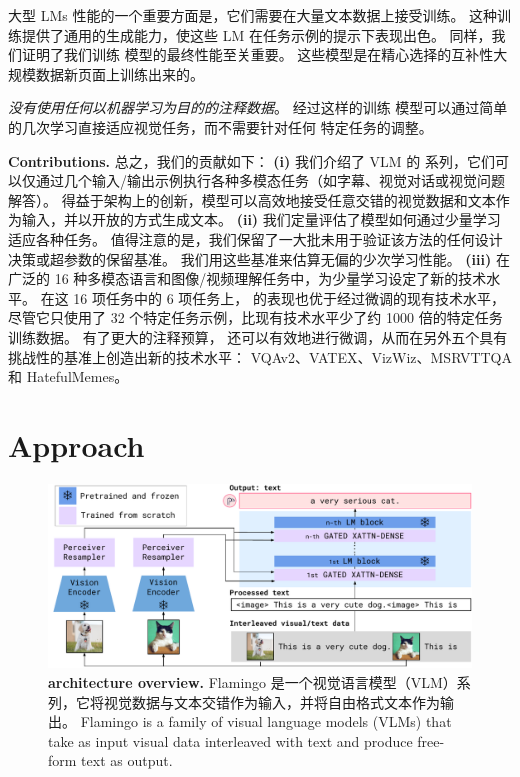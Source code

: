 \parbox{\textwidth}{大型 LMs 性能的一个重要方面是，它们需要在大量文本数据上接受训练。
这种训练提供了通用的生成能力，使这些 LM 在任务示例的提示下表现出色。
同样，我们证明了我们训练
\method{}模型的最终性能至关重要。
这些模型是在精心选择的互补性大规模数据新页面上训练出来的。\parfillskip=0pt} \emph{没有使用任何以机器学习为目的的注释数据}。
经过这样的训练
\method{} 模型可以通过简单的几次学习直接适应视觉任务，而不需要针对任何
特定任务的调整。



\noindent
\textbf{Contributions.}
总之，我们的贡献如下：
\textbf{(i)} 我们介绍了 VLM 的 \method{} 系列，它们可以仅通过几个输入/输出示例执行各种多模态任务（如字幕、视觉对话或视觉问题解答）。
得益于架构上的创新，\method{}模型可以高效地接受任意交错的视觉数据和文本作为输入，并以开放的方式生成文本。%
\textbf{(ii)} 我们定量评估了模型如何通过少量学习适应各种任务。%
值得注意的是，我们保留了一大批未用于验证该方法的任何设计决策或超参数的保留基准。
我们用这些基准来估算无偏的少次学习性能。
\textbf{(iii)} \largem{} 在广泛的 16 种多模态语言和图像/视频理解任务中，为少量学习设定了新的技术水平。
在这 16 项任务中的 6 项任务上，\largem{} 的表现也优于经过微调的现有技术水平，尽管它只使用了 32 个特定任务示例，比现有技术水平少了约 1000 倍的特定任务训练数据。
有了更大的注释预算，\largem{} 还可以有效地进行微调，从而在另外五个具有挑战性的基准上创造出新的技术水平： VQAv2、VATEX、VizWiz、MSRVTTQA 和 HatefulMemes。







\section{Approach}
\label{sec:approach}

\begin{figure}[t!]
\includegraphics[width= \linewidth]{figures/fig2_overview_interleaved_v2.pdf}
\centering
\caption{\capfontsize{} \textbf{\method{} architecture overview.} 
Flamingo 是一个视觉语言模型（VLM）系列，它将视觉数据与文本交错作为输入，并将自由格式文本作为输出。
Flamingo is a family of visual language models (VLMs) that take as input visual data interleaved with text and  produce free-form text as output. 
}
\label{fig:overview}
\end{figure}

